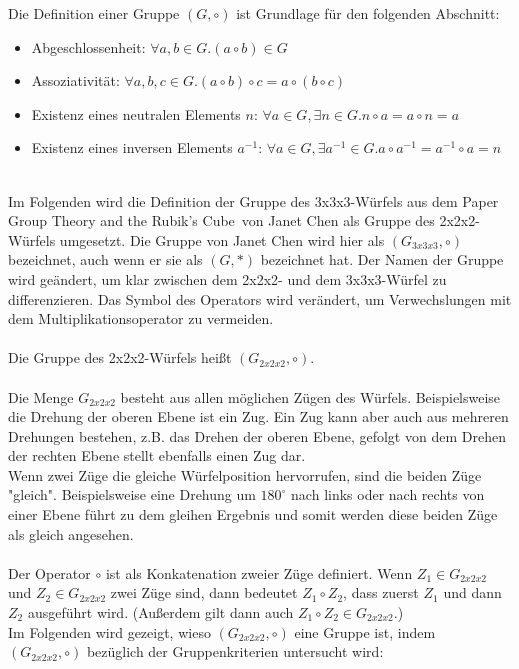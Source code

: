 \documentclass[12pt,a4paper, usenames, dvipsnames]{article}
\begin{document}
Die Definition einer Gruppe $(G, \circ)$ ist Grundlage für den folgenden Abschnitt:
\begin{itemize}
\item Abgeschlossenheit: $\forall a,b \in G.(a \circ b) \in G $
\item Assoziativität: $\forall a,b,c \in G.(a \circ b) \circ c = a \circ (b \circ c)$
\item Existenz eines neutralen Elements $n$: $\forall a \in G, \exists n \in G.n \circ a = a \circ n = a$ 
\item Existenz eines inversen Elements $a^{-1}$: $\forall a \in G, \exists a^{-1} \in G. a \circ a^{-1} = a^{-1} \circ a = n$ 
\end{itemize}
\ \\
Im Folgenden wird die Definition der Gruppe des 3x3x3-Würfels aus dem Paper \glqq Group Theory and the Rubik's Cube\grqq \  von Janet Chen \cite{JC} als Gruppe des 2x2x2-Würfels umgesetzt. Die Gruppe von Janet Chen wird hier als $(G_{3x3x3}, \circ)$ bezeichnet, auch wenn er sie als $(G, *)$ bezeichnet hat. Der Namen der Gruppe wird geändert, um klar zwischen dem 2x2x2- und dem 3x3x3-Würfel zu differenzieren. Das Symbol des Operators wird verändert, um Verwechslungen mit dem Multiplikationsoperator zu vermeiden. \\
\\ 
Die Gruppe des 2x2x2-Würfels heißt $(G_{2x2x2}, \circ)$. \\
\\
Die Menge $G_{2x2x2}$ besteht aus allen möglichen Zügen des Würfels. Beispielsweise die Drehung der oberen Ebene ist ein Zug. Ein Zug kann aber auch aus mehreren Drehungen bestehen, z.B. das Drehen der oberen Ebene, gefolgt von dem Drehen der rechten Ebene stellt ebenfalls einen Zug dar. \\
Wenn zwei Züge die gleiche Würfelposition hervorrufen, sind die beiden Züge "gleich". Beispielsweise eine Drehung um $180^{\circ}$ nach links oder nach rechts von einer Ebene führt zu dem gleihen Ergebnis und somit werden diese beiden Züge als gleich angesehen. \\
\\
Der Operator $\circ$ ist als Konkatenation zweier Züge definiert. Wenn $Z_1 \in G_{2x2x2}$ und $Z_2 \in G_{2x2x2}$ zwei Züge sind, dann bedeutet $Z_1 \circ Z_2$, dass zuerst $Z_1$ und dann $Z_2$ ausgeführt wird. (Außerdem gilt dann auch $Z_1 \circ Z_2 \in G_{2x2x2}$.) \\
Im Folgenden wird gezeigt, wieso $(G_{2x2x2}, \circ)$ eine Gruppe ist, indem $(G_{2x2x2}, \circ)$ bezüglich der Gruppenkriterien untersucht wird: \\
\end{document}
